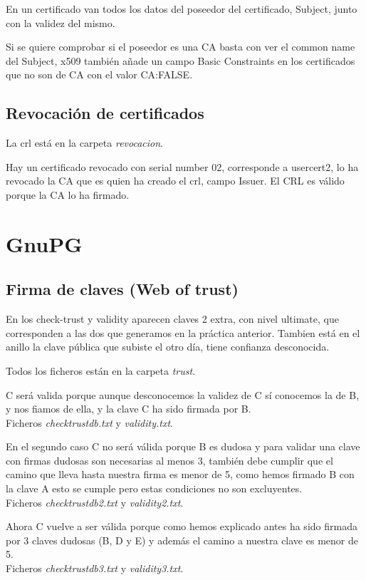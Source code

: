\documentclass[11pt]{article}
\begin{document}
      \bigskip
      \par
      En un certificado van todos los datos del poseedor del certificado, Subject, junto con la
      validez del mismo.

      \bigskip
      \par
      Si se quiere comprobar si el poseedor es una CA basta con ver el common name del Subject,
      x509 también añade un campo Basic Constraints en los certificados que no son de CA con el
      valor CA:FALSE.

    \subsection{Revocación de certificados}
      \par
      La crl está en la carpeta \textit{revocacion}.


      \bigskip
      \par
      Hay un certificado revocado con serial number 02, corresponde a usercert2, lo ha revocado la CA que
      es quien ha creado el crl, campo Issuer. El CRL es válido porque la CA lo ha firmado.

  \section{GnuPG}
    \subsection{Firma de claves (Web of trust)}
      \par
      En los check-trust y validity aparecen claves 2 extra, con nivel ultimate, que corresponden a las dos que generamos en
      la práctica anterior. Tambien está en el anillo la clave pública que subiste el otro día, tiene confianza desconocida.

      \bigskip
      \par
      Todos los ficheros están en la carpeta \textit{trust}.

      \bigskip
      \par
      C será valida porque aunque desconocemos la validez de C sí conocemos la de B, y nos
      fiamos de ella, y la clave C ha sido firmada por B.\\
      Ficheros \textit{checktrustdb.txt} y \textit{validity.txt}.

      \bigskip
      \par
      En el segundo caso C no será válida porque B es dudosa y para validar una clave con firmas
      dudosas son necesarias al menos 3, también debe cumplir que el camino que lleva hasta nuestra
      firma es menor de 5, como hemos firmado B con la clave A esto se cumple pero estas condiciones
      no son excluyentes.\\
      Ficheros \textit{checktrustdb2.txt} y \textit{validity2.txt}.

      \bigskip
      \par
      Ahora C vuelve a ser válida porque como hemos explicado antes ha sido firmada por 3 claves
      dudosas (B, D y E) y además el camino a nuestra clave es menor de 5.\\
      Ficheros \textit{checktrustdb3.txt} y \textit{validity3.txt}.
    
\end{document}
